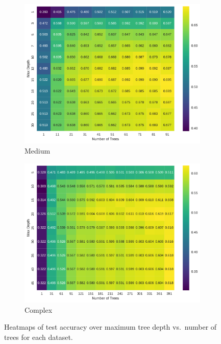 \documentclass[conference]{IEEEtran}
\begin{document}
\begin{figure}[H]
  \begin{subfigure}[b]{\columnwidth}
    \includegraphics[width=\linewidth]{images/medium_depth_vs_trees_heatmap.pdf}
    \caption{Medium}
    \label{fig:exp3-medium-heatmap}
  \end{subfigure}\hfill
  \begin{subfigure}[b]{\columnwidth}
    \includegraphics[width=\linewidth]{images/complex_depth_vs_trees_heatmap.pdf}
    \caption{Complex}
    \label{fig:exp3-complex-heatmap}
  \end{subfigure}

  \caption{Heatmaps of test accuracy over maximum tree depth vs.\ number of trees for each dataset.}
  \label{fig:exp3-depth-trees-heatmaps}
\end{figure}
\end{document}
